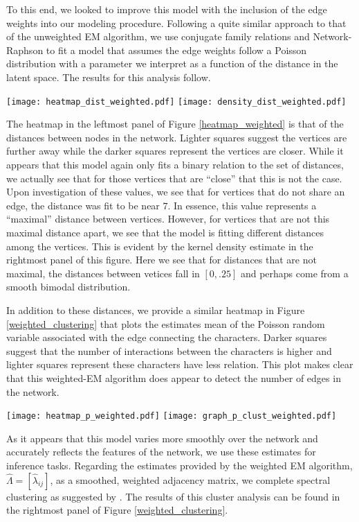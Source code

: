\documentclass{article}
\begin{document}
To this end, we looked to improve this model with the inclusion of the edge weights into our modeling procedure. Following a quite similar approach to that of the unweighted EM algorithm, we use conjugate family relations and Network-Raphson to fit a model that assumes the edge weights follow a Poisson distribution with a parameter we interpret as a function of the distance in the latent space. The results for this analysis follow.
\begin{center}\label{heatmap_weighted}
\texttt{[image: heatmap\_dist\_weighted.pdf]}
\texttt{[image: density\_dist\_weighted.pdf]}
\end{center}
The heatmap in the leftmost panel of Figure \ref{heatmap_weighted} is that of the distances between nodes in the network. Lighter squares suggest the vertices are further away while the darker squares represent the vertices are closer. While it appears that this model again only fits a binary relation to the set of distances, we actually see that for those vertices that are ``close'' that this is not the case. Upon investigation of these values, we see that for vertices that do not share an edge, the distance was fit to be near $7$. In essence, this value represents a ``maximal'' distance between vertices. However, for vertices that are not this maximal distance apart, we see that the model is fitting different distances among the vertices. This is evident by the kernel density estimate in the rightmost panel of this figure. Here we see that for distances that are not maximal, the distances between vetices fall in $[0,.25]$ and perhaps come from a smooth bimodal distribution.


In addition to these distances, we provide a similar heatmap in Figure \ref{weighted_clustering} that plots the estimates mean of the Poisson random variable associated with the edge connecting the characters. Darker squares suggest that the number of interactions between the characters is higher and lighter squares represent these characters have less relation. This plot makes clear that this weighted-EM algorithm does appear to detect the number of edges in the network. 


\begin{center}\label{weighted_clustering}
\texttt{[image: heatmap\_p\_weighted.pdf]}
\texttt{[image: graph\_p\_clust\_weighted.pdf]}
\end{center}

As it appears that this model varies more smoothly over the network and accurately reflects the features of the network, we use these estimates for inference tasks. Regarding the estimates provided by the weighted EM algorithm, $\widehat{\Lambda} = [\hat{\lambda}_{ij}]$, as a smoothed, weighted adjacency matrix, we complete spectral clustering as suggested by \cite{Ng:2001:SCA:2980539.2980649}. The results of this cluster analysis can be found in the rightmost panel of Figure \ref{weighted_clustering}. 
\end{document}
